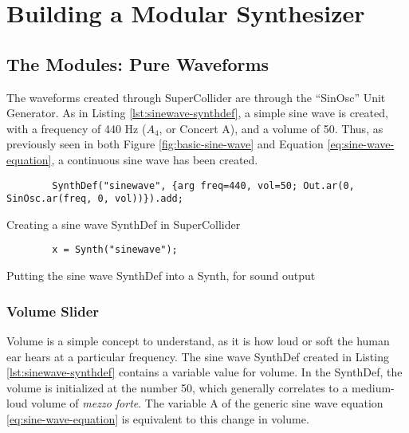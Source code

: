 \chapter{Building a Modular Synthesizer}\label{chapter:building-a-mod-synth}

\section{The Modules: Pure Waveforms}

The waveforms created through SuperCollider are through the ``SinOsc'' Unit Generator. As in Listing \ref{lst:sinewave-synthdef}, a simple sine wave is created, with a frequency of 440 Hz ($A_4$, or Concert A), and a volume of 50. Thus, as previously seen in both Figure \ref{fig:basic-sine-wave} and Equation \ref{eq:sine-wave-equation}, a continuous sine wave has been created.

\begin{listing}
	\begin{lstlisting}
		SynthDef("sinewave", {arg freq=440, vol=50; Out.ar(0, SinOsc.ar(freq, 0, vol))}).add;
	\end{lstlisting}
	\caption{Creating a sine wave SynthDef in SuperCollider}
	\label{lst:sinewave-synthdef}
\end{listing}

\begin{listing}
	\begin{lstlisting}
		x = Synth("sinewave");
	\end{lstlisting}
	\caption{Putting the sine wave SynthDef into a Synth, for sound output}
	\label{lst:sinewave-synth}
\end{listing}

\subsection{Volume Slider}

Volume is a simple concept to understand, as it is how loud or soft the human ear hears at a particular frequency. The sine wave SynthDef created in Listing \ref{lst:sinewave-synthdef} contains a variable value for volume. In the SynthDef, the volume is initialized at the number 50, which generally correlates to a medium-loud volume of \textit{mezzo forte}. The variable A of the generic sine wave equation \ref{eq:sine-wave-equation} is equivalent to this change in volume.

